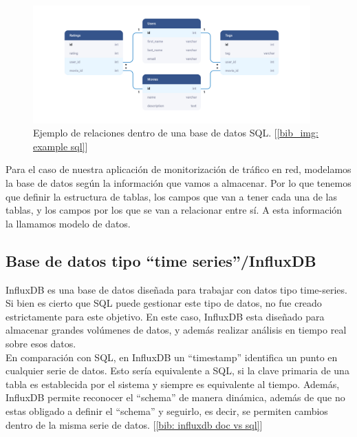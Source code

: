 \documentclass[a4paper, oneside, 12pt]{book}
\begin{document}
	\begin{figure}[h!]
		\begin{center}
			\includegraphics[width=0.95\textwidth]{img/example_relational_database.jpg}
			\caption{Ejemplo de relaciones dentro de una base de datos SQL. [\ref{bib_img: example sql}]}
			\label{img: example sql}
		\end{center}
	\end{figure}
	
	\noindent Para el caso de nuestra aplicación de monitorización de tráfico en red, modelamos la base de datos según la información que vamos a almacenar. Por lo que tenemos que definir la estructura de tablas, los campos que van a tener cada una de las tablas, y los campos por los que se van a relacionar entre sí. A esta información la llamamos modelo de datos.
	
	
	
	\pagebreak
	
	\subsection{Base de datos tipo ``time series''/InfluxDB} 
	
	\noindent InfluxDB es una base de datos diseñada para trabajar con datos tipo time-series. Si bien es cierto que SQL puede gestionar este tipo de datos, no fue creado estrictamente para este objetivo. En este caso, InfluxDB esta diseñado para almacenar grandes volúmenes de datos, y además realizar análisis en tiempo real sobre esos datos. \\
	
	\noindent En comparación con SQL, en InfluxDB un ``timestamp'' identifica un punto en cualquier serie de datos. Esto sería equivalente a SQL, si la clave primaria de una tabla es establecida por el sistema y siempre es equivalente al tiempo. Además, InfluxDB permite reconocer el ``schema'' de manera dinámica, además de que no estas obligado a definir el ``schema'' y seguirlo, es decir, se permiten cambios dentro de la misma serie de datos. [\ref{bib: influxdb doc vs sql}] \\
	
\end{document}
